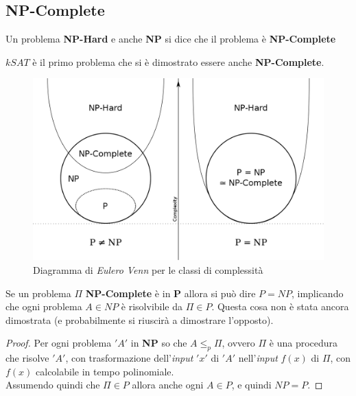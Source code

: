 						\subsection{NP-Complete}
						\begin{definizione}
							Un problema \textbf{NP-Hard} e anche \textbf{NP} si dice che il problema è
							\textbf{NP-Complete} 
						\end{definizione}
						\begin{nota}
							$kSAT$ è il primo problema che si è dimostrato essere anche \textbf{NP-Complete}.
						\end{nota}
						\begin{figure}[h!]
							\centering
							\includegraphics[scale = 0.3]{img/problem.png}
							\caption{Diagramma di \emph{Eulero Venn} per le classi di complessità}
							\label{fig:complexity}
						\end{figure}
						\begin{definizione}
							Se un problema $\Pi$ \textbf{NP-Complete} è in \textbf{P} allora si può dire
							$P=NP$, implicando che ogni problema $A\in NP$ è risolvibile da $\Pi\in P$.
							Questa cosa non è stata ancora dimostrata (e probabilmente si riuscirà
							a dimostrare l'opposto).
							\begin{proof}
								Per ogni problema $ 'A' $ in \textbf{NP} so che $A\leq_p \Pi$, ovvero $\Pi$ è una
								procedura che risolve $ 'A' $, con trasformazione dell'\textit{input} $ 'x' $ di $ 'A' $ nell'\textit{input}
								$f(x)$ di $\Pi$, con $f(x)$ calcolabile in tempo polinomiale.\\
								Assumendo quindi che $\Pi\in P$ allora anche ogni $A\in P$, e quindi $NP=P$.
							\end{proof}
						\end{definizione}
